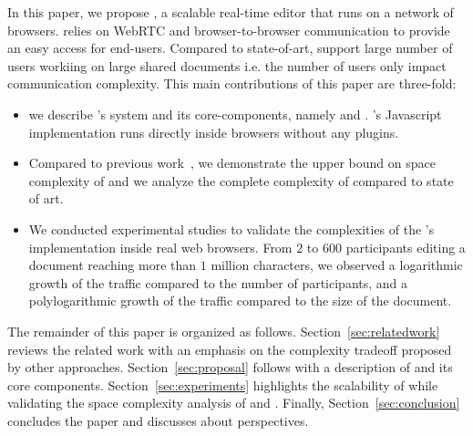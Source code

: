 In this paper, we propose \CRATE, a scalable real-time editor that runs on a network of
browsers. \CRATE relies on WebRTC and browser-to-browser communication to
provide an easy access for end-users. Compared to state-of-art, \CRATE
support large number of users workiing on large shared
documents i.e. the number of users only impact communication
complexity. This main contributions of this paper are three-fold:
\begin{itemize}
\item we describe \CRATE's system and its core-components, namely \LSEQ and
  \SPRAY. \CRATE's Javascript implementation runs directly inside browsers
  without any plugins.
\item Compared to previous work~\cite{nedelec2013lseq}, we demonstrate the upper
  bound on space complexity of \LSEQ and we analyze the complete complexity of
  \CRATE compared to state of art.
\item We conducted experimental studies to validate the complexities of the
  \CRATE's implementation inside real web browsers. From $2$ to $600$
  participants editing a document reaching more than $1$ million characters, we
  observed a logarithmic growth of the traffic compared to the number of
  participants, and a polylogarithmic growth of the traffic compared to the size
  of the document.
\end{itemize}

The remainder of this paper is organized as
follows. Section~\ref{sec:relatedwork} reviews the related work with an emphasis
on the complexity tradeoff proposed by other
approaches. Section~\ref{sec:proposal} follows with a description of \CRATE and
its core components. Section~\ref{sec:experiments} highlights the scalability of
\CRATE while validating the space complexity analysis of \LSEQ and
\SPRAY. Finally, Section~\ref{sec:conclusion} concludes the paper and discusses
about perspectives.

